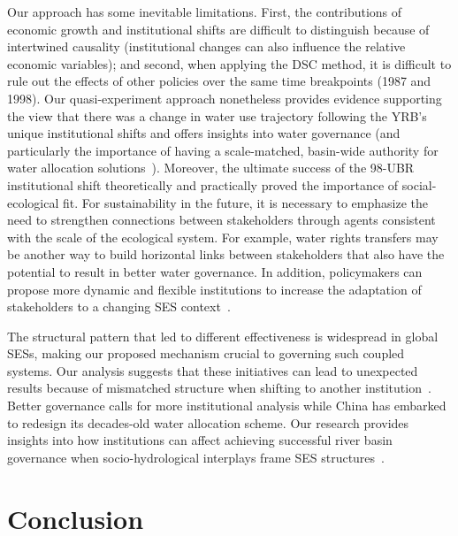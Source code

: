 \documentclass[preprint, 12pt]{elsarticle}
\begin{document}
Our approach has some inevitable limitations.
First, the contributions of economic growth and institutional shifts are difficult to distinguish because of intertwined causality (institutional changes can also influence the relative economic variables);
and second, when applying the DSC method, it is difficult to rule out the effects of other policies over the same time breakpoints (1987 and 1998).
Our quasi-experiment approach nonetheless provides evidence supporting the view that there was a change in water use trajectory following the YRB's unique institutional shifts and offers insights into water governance (and particularly the importance of having a scale-matched, basin-wide authority for water allocation solutions~\cite{bodin2017b, ostrom2009, reyers2018}).
Moreover, the ultimate success of the 98-UBR institutional shift theoretically and practically proved the importance of social-ecological fit.
For sustainability in the future, it is necessary to emphasize the need to strengthen connections between stakeholders through agents consistent with the scale of the ecological system.
For example, water rights transfers may be another way to build horizontal links between stakeholders that also have the potential to result in better water governance.
In addition, policymakers can propose more dynamic and flexible institutions to increase the adaptation of stakeholders to a changing SES context~\cite{reyers2018}.

The structural pattern that led to different effectiveness is widespread in global SESs, making our proposed mechanism crucial to governing such coupled systems.
Our analysis suggests that these initiatives can lead to unexpected results because of mismatched structure when shifting to another institution~\cite{bodin2017b}.
Better governance calls for more institutional analysis while China has embarked to redesign its decades-old water allocation scheme.
Our research provides insights into how institutions can affect achieving successful river basin governance when socio-hydrological interplays frame SES structures~\cite{muneepeerakul2017, leslie2015, hegwood2022}.

\section{Conclusion}\label{sec:conclusion}
\end{document}

